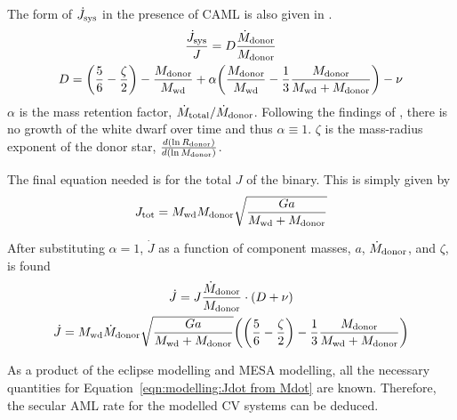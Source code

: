 The form of $\dot J_{\rm sys}$ in the presence of CAML is also given in \citet{king1995}.
\begin{gather}
    \frac{\dot J_{\rm sys}}{J} = D \frac{\dot M_{\rm donor}}{M_{\rm donor}} \\
    D = \bigg(\frac{5}{6} - \frac{\zeta}{2}\bigg) - \frac{M_{\rm donor}}{M_{\rm wd}} + \alpha \bigg( \frac{M_{\rm donor}}{M_{\rm wd}} - \frac{1}{3} \frac{M_{\rm donor}}{M_{\rm wd} + M_{\rm donor}} \bigg)  - \nu
\end{gather}
$\alpha$ is the mass retention factor, $\dot M_{\rm total} / \dot M_{\rm donor}$. Following the findings of \citet{McAllister2019}, there is no growth of the white dwarf over time and thus $\alpha \equiv 1$. $\zeta$ is the mass-radius exponent of the donor star, $\frac{d(\ln R_{\rm donor})}{d(\ln M_{\rm donor})}$.

The final equation needed is for the total $J$ of the binary. This is simply given by
\begin{equation}
    J_{\rm tot} = M_{\rm wd} M_{\rm donor} \sqrt{\frac{G a }{M_{\rm wd} + M_{\rm donor}}}
\end{equation}

After substituting $\alpha = 1$, $\dot J$ as a function of component masses, $a$, $\dot M_{\rm donor}$, and $\zeta$, is found
\begin{gather}
    \dot J = J \frac{\dot M_{\rm donor}}{M_{\rm donor}} \cdot (D + \nu) \\
    \dot J = M_{\rm wd} \dot M_{\rm donor} \sqrt{\frac{G a }{M_{\rm wd} + M_{\rm donor}}} \bigg( \bigg(\frac{5}{6} - \frac{\zeta}{2}\bigg )  - \frac{1}{3} \frac{M_{\rm donor}}{M_{\rm wd} + M_{\rm donor}}\bigg ) \label{eqn:modelling:Jdot from Mdot}
\end{gather}

As a product of the eclipse modelling and MESA modelling, all the necessary quantities for Equation~\ref{eqn:modelling:Jdot from Mdot} are known. Therefore, the secular AML rate for the modelled CV systems can be deduced.